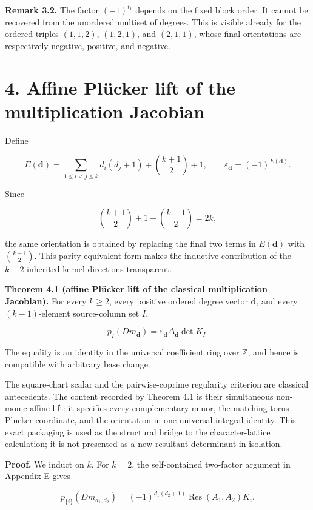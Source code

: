\documentclass[
  11pt,
  a4paper,
]{article}
\begin{document}
\textbf{Remark 3.2.} The factor \((-1)^{t_1}\) depends on the fixed
block order. It cannot be recovered from the unordered multiset of
degrees. This is visible already for the ordered triples \((1,1,2)\),
\((1,2,1)\), and \((2,1,1)\), whose final orientations are respectively
negative, positive, and negative.

\section{4. Affine Plücker lift of the multiplication
Jacobian}\label{affine-pluxfccker-lift-of-the-multiplication-jacobian}

Define

\[
E(\mathbf d)=
 \sum_{1\le i<j\le k}d_i(d_j+1)+\binom{k+1}{2}+1,
 \qquad
 \varepsilon_{\mathbf d}=(-1)^{E(\mathbf d)}.
\]

Since

\[
 \binom{k+1}{2}+1-\binom{k-1}{2}=2k,
\]

the same orientation is obtained by replacing the final two terms in
\(E(\mathbf d)\) with \(\binom{k-1}{2}\). This parity-equivalent form
makes the inductive contribution of the \(k-2\) inherited kernel
directions transparent.

\textbf{Theorem 4.1 (affine Plücker lift of the classical multiplication
Jacobian).} For every \(k\ge2\), every positive ordered degree vector
\(\mathbf d\), and every \((k-1)\)-element source-column set \(I\),

\[
 \boxed{
 p_I(Dm_{\mathbf d})
 =\varepsilon_{\mathbf d}\Delta_{\mathbf d}\det K_I.
 }
\]

The equality is an identity in the universal coefficient ring over
\(\mathbb Z\), and hence is compatible with arbitrary base change.

The square-chart scalar and the pairwise-coprime regularity criterion
are classical antecedents. The content recorded by Theorem 4.1 is their
simultaneous non-monic affine lift: it specifies every complementary
minor, the matching torus Plücker coordinate, and the orientation in one
universal integral identity. This exact packaging is used as the
structural bridge to the character-lattice calculation; it is not
presented as a new resultant determinant in isolation.

\textbf{Proof.} We induct on \(k\). For \(k=2\), the self-contained
two-factor argument in Appendix E gives

\[
 p_{\{i\}}(Dm_{d_1,d_2})
 =(-1)^{d_1(d_2+1)}
   \operatorname{Res}(A_1,A_2)K_i.
\]
\end{document}
